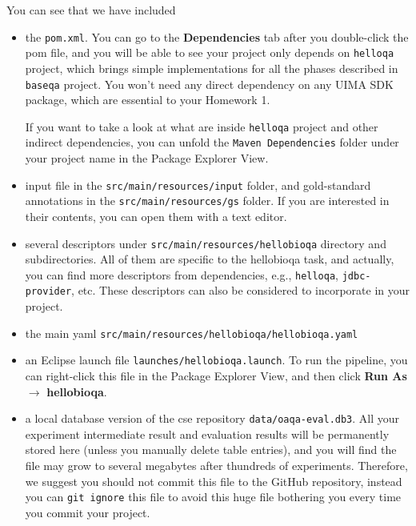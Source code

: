 You can see that we have included

\begin{itemize}

\item the \texttt{pom.xml}. You can go to the \textbf{Dependencies} tab after
you double-click the pom file, and you will be able to see your project only
depends on \texttt{helloqa} project, which brings simple implementations for all
the phases described in \texttt{baseqa} project. You won't need any direct
dependency on any UIMA SDK package, which are essential to your Homework 1.

If you want to take a look at what are inside \texttt{helloqa} project and
other indirect dependencies, you can unfold the \texttt{Maven Dependencies}
folder under your project name in the Package Explorer View.

\item input file in the \texttt{src/main/resources/input} folder, and
gold-standard annotations in the \texttt{src/main/resources/gs} folder. If you
are interested in their contents, you can open them with a text editor.

\item several descriptors under \texttt{src/main/resources/hellobioqa} directory
and subdirectories. All of them are specific to the hellobioqa task, and
actually, you can find more descriptors from dependencies, e.g.,
\texttt{helloqa}, \texttt{jdbc-provider}, etc. These descriptors can also be
considered to incorporate in your project.

\item the main yaml \texttt{src/main/resources/hellobioqa/hellobioqa.yaml}

\item an Eclipse launch file \texttt{launches/hellobioqa.launch}. To run the
pipeline, you can right-click this file in the Package Explorer View, and then
click \textbf{Run As} $\rightarrow$ \textbf{hellobioqa}.

\item a local database version of the cse repository
\texttt{data/oaqa-eval.db3}. All your experiment intermediate result and
evaluation results will be permanently stored here (unless you manually delete
table entries), and you will find the file may grow to several megabytes after
thundreds of experiments. Therefore, we suggest you should not commit this file
to the GitHub repository, instead you can \texttt{git ignore} this file to avoid
this huge file bothering you every time you commit your project.

\end{itemize}

